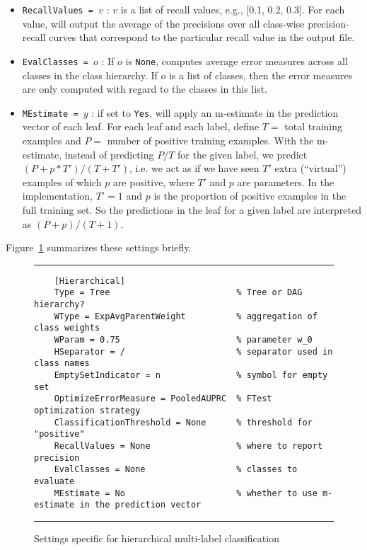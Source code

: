 \begin{itemize}
	\item {\tt RecallValues = $v$} : $v$ is a list of recall values, e.g., [0.1, 0.2, 0.3]. For each value, \clus{} will output the average of the precisions over all class-wise precision-recall curves that correspond to the particular recall value in the output file.
	\item {\tt EvalClasses = $o$} : If $o$ is {\tt None}, \clus{} computes average error measures across all classes in the class  hierarchy. If $o$ is a list of classes, then the error measures are only computed with regard to the classes in this list.
	\item {\tt MEstimate = $y$} : if set to {\tt Yes}, \clus{} will apply an m-estimate in the prediction vector of each leaf. For each leaf and each label, define $T =$ total training examples and $P =$ number of positive training examples. With the m-estimate, instead of predicting $P/T$ for the given label, we predict $(P+p*T') /
	(T+T')$, i.e. we act as if we have seen $T'$ extra (``virtual'') examples of
	which $p$ are positive, where $T'$ and $p$ are parameters. In the \clus{}
	implementation, $T'=1$ and $p$ is the proportion of positive examples in the full
	training set. So the predictions in the leaf for a given label are interpreted as $(P+p) /
	(T+1)$.
	
\end{itemize}
Figure~\ref{settings-hmc:fig} summarizes these settings briefly.

\begin{figure}[tb]
	\hrule\vspace{1em}
	\begin{verbatim}
	[Hierarchical]
	Type = Tree                         % Tree or DAG hierarchy?
	WType = ExpAvgParentWeight          % aggregation of class weights
	WParam = 0.75                       % parameter w_0
	HSeparator = /                      % separator used in class names
	EmptySetIndicator = n               % symbol for empty set
	OptimizeErrorMeasure = PooledAUPRC  % FTest optimization strategy
	ClassificationThreshold = None      % threshold for "positive"
	RecallValues = None                 % where to report precision
	EvalClasses = None                  % classes to evaluate
	MEstimate = No                      % whether to use m-estimate in the prediction vector
	\end{verbatim}
	\hrule
	\caption{Settings specific for hierarchical multi-label classification}
	\label{settings-hmc:fig}
\end{figure}